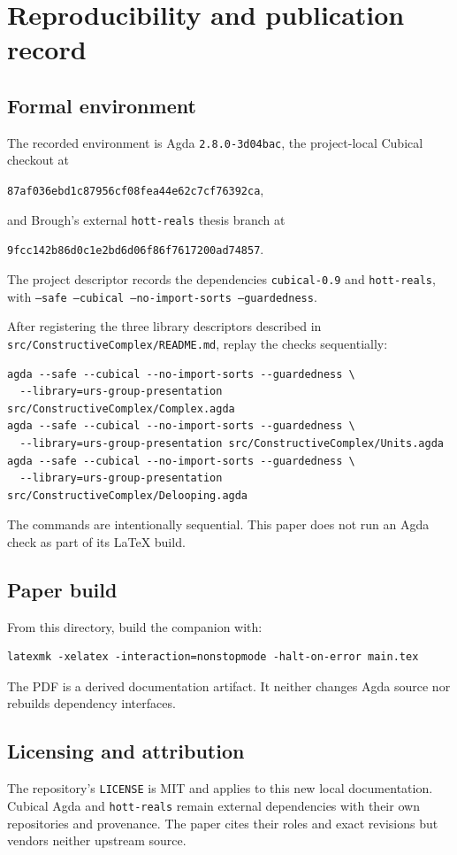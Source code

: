 \section{Reproducibility and publication record}
\label{app:reproducibility}

\subsection{Formal environment}
The recorded environment is Agda \texttt{2.8.0-3d04bac}, the project-local
Cubical checkout at
\begin{center}
\texttt{87af036ebd1c87956cf08fea44e62c7cf76392ca},
\end{center}
and Brough's external \texttt{hott-reals} thesis branch at
\begin{center}
\texttt{9fcc142b86d0c1e2bd6d06f86f7617200ad74857}.
\end{center}
The project descriptor records the dependencies \texttt{cubical-0.9} and
\texttt{hott-reals}, with
\texttt{--safe --cubical --no-import-sorts --guardedness}.

After registering the three library descriptors described in
\texttt{src/ConstructiveComplex/README.md}, replay the checks sequentially:
{\small\begin{verbatim}
agda --safe --cubical --no-import-sorts --guardedness \
  --library=urs-group-presentation src/ConstructiveComplex/Complex.agda
agda --safe --cubical --no-import-sorts --guardedness \
  --library=urs-group-presentation src/ConstructiveComplex/Units.agda
agda --safe --cubical --no-import-sorts --guardedness \
  --library=urs-group-presentation src/ConstructiveComplex/Delooping.agda
\end{verbatim}}
The commands are intentionally sequential.  This paper does not run an Agda
check as part of its LaTeX build.

\subsection{Paper build}
From this directory, build the companion with:
{\small\begin{verbatim}
latexmk -xelatex -interaction=nonstopmode -halt-on-error main.tex
\end{verbatim}}
The PDF is a derived documentation artifact.  It neither changes Agda source
nor rebuilds dependency interfaces.

\subsection{Licensing and attribution}
The repository's \texttt{LICENSE} is MIT and applies to this new local
documentation.  Cubical Agda and \texttt{hott-reals} remain external
dependencies with their own repositories and provenance.  The paper cites
their roles and exact revisions but vendors neither upstream source.
